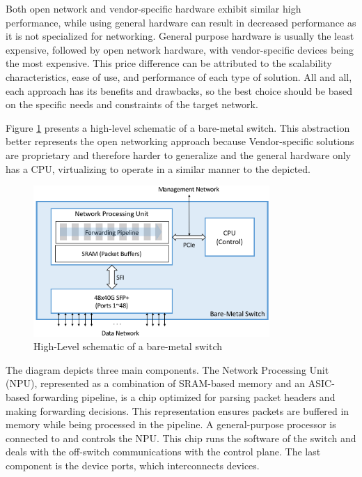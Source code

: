 Both open network and vendor-specific hardware exhibit similar high performance, while using general hardware can result in decreased performance as it is not specialized for networking. General purpose hardware is usually the least expensive, followed by open network hardware, with vendor-specific devices being the most expensive. This price difference can be attributed to the scalability characteristics, ease of use, and performance of each type of solution. All and all, each approach has its benefits and drawbacks, so the best choice should be based on the specific needs and constraints of the target network.

Figure \ref{fig:switch_schematic} presents a high-level schematic of a bare-metal switch. This abstraction better represents the open networking approach because Vendor-specific solutions are proprietary and therefore harder to generalize and the general hardware only has a CPU, virtualizing to operate in a similar manner to the depicted.

\begin{figure}
	\centering
	\includegraphics[width=0.8\textwidth]{Chapters/Figures/SDNs/switch_schematic.png}
	\caption{High-Level schematic of a bare-metal switch\cite{peterson_software-defined_2021}}
	\label{fig:switch_schematic}
\end{figure}

The diagram depicts three main components. The Network Processing Unit (NPU), represented as a combination of SRAM-based memory and an ASIC-based forwarding pipeline, is a chip optimized for parsing packet headers and making forwarding decisions. This representation ensures packets are buffered in memory while being processed in the pipeline. A general-purpose processor is connected to and controls the NPU. This chip runs the software of the switch and deals with the off-switch communications with the control plane. The last component is the device ports, which interconnects devices.

